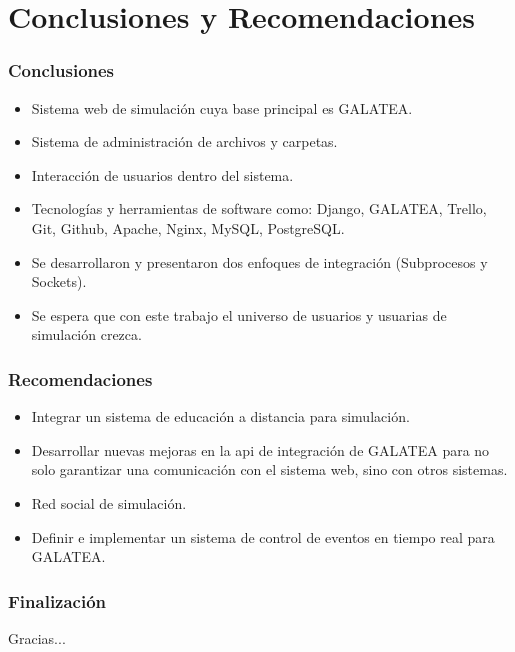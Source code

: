 \documentclass[spanish,xcolor=dvipsnames]{beamer}
\begin{document}
    \section{Conclusiones y Recomendaciones}
    \begin{frame}
    	\frametitle{Conclusiones}
    	
    	\begin{itemize}
    		\item Sistema web de simulación cuya base principal es GALATEA.
    		\item Sistema de administración de archivos y carpetas.
    		\item Interacción de usuarios dentro del sistema.
    		\item Tecnologías y herramientas de software como: Django, GALATEA, Trello, Git, Github, Apache, Nginx, MySQL, PostgreSQL.
    		\item Se desarrollaron y presentaron dos enfoques de integración (Subprocesos y Sockets).
    		\item Se espera que con este trabajo el universo de usuarios y usuarias de simulación crezca.
    	\end{itemize}
    	
    \end{frame}
    \begin{frame}
    	\frametitle{Recomendaciones}
    	
    	\begin{itemize}
    		\item Integrar un sistema de educación a distancia para simulación.
    		\item Desarrollar nuevas mejoras en la api de integración de GALATEA para no solo garantizar una comunicación con el sistema web, sino con otros sistemas.
    		\item Red social de simulación.
    		\item Definir e implementar un sistema de control de eventos en tiempo real para GALATEA.
    	\end{itemize}
    	
    \end{frame}
    \begin{frame}
    	\frametitle{Finalización}
    	
    	{\Huge Gracias}...
    	
    \end{frame}
\end{document}
